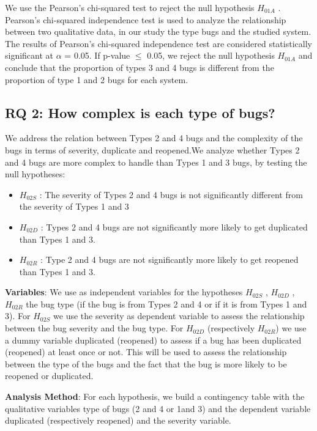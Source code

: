 We use the Pearson's chi-squared test to reject the null hypothesis
\(H_{01A}\) . Pearson's chi-squared independence test is used to analyze
the relationship between two qualitative data, in our study the type
bugs and the studied system. The results of Pearson's chi-squared
independence test are considered statistically significant at \(\alpha\)
= 0.05. If p-value \(\le\) 0.05, we reject the null hypothesis
\(H_{01A}\) and conclude that the proportion of types 3 and 4 bugs is
different from the proportion of type 1 and 2 bugs for each system.

\subsection{RQ 2: How complex is each type of
bugs?}\label{rq-2-how-complex-is-each-type-of-bugs}

We address the relation between Types 2 and 4 bugs and the complexity of
the bugs in terms of severity, duplicate and reopened.We analyze whether
Types 2 and 4 bugs are more complex to handle than Types 1 and 3 bugs,
by testing the null hypotheses:

\begin{itemize}
\item
  \(H_{02S}\) : The severity of Types 2 and 4 bugs is not significantly
  different from the severity of Types 1 and 3
\item
  \(H_{02D}\) : Types 2 and 4 bugs are not significantly more likely to
  get duplicated than Types 1 and 3.
\item
  \(H_{02R}\) : Type 2 and 4 bugs are not significantly more likely to
  get reopened than Types 1 and 3.
\end{itemize}

{\textbf{Variables}}: We use as independent variables for the hypotheses
\(H_{02S}\) , \(H_{02D}\) , \(H_{02R}\) the bug type (if the bug is from
Types 2 and 4 or if it is from Types 1 and 3). For \(H_{02S}\) we use
the severity as dependent variable to assess the relationship between
the bug severity and the bug type. For \(H_{02D}\) (respectively
\(H_{02R}\)) we use a dummy variable duplicated (reopened) to assess if
a bug has been duplicated (reopened) at least once or not. This will be
used to assess the relationship between the type of the bugs and the
fact that the bug is more likely to be reopened or duplicated.

{\textbf{Analysis Method}}: For each hypothesis, we build a contingency
table with the qualitative variables type of bugs (2 and 4 or 1and 3)
and the dependent variable duplicated (respectively reopened) and the
severity variable.


